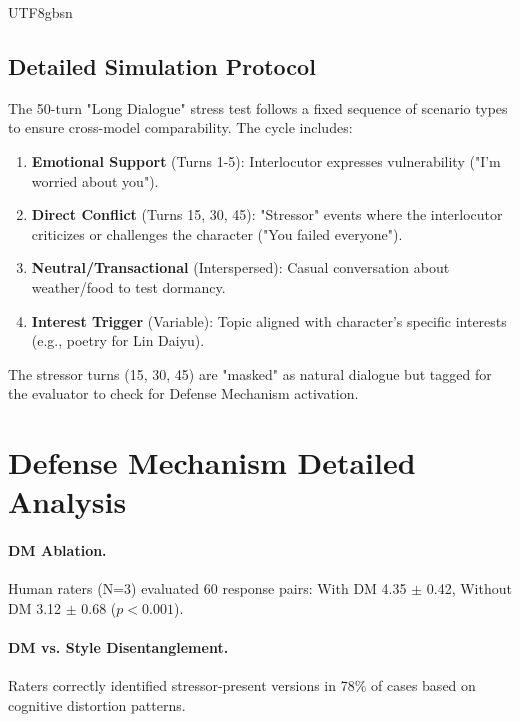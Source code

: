 \documentclass[11pt]{article}
\begin{document}
\begin{CJK*}{UTF8}{gbsn}
\subsection{Detailed Simulation Protocol}
\label{sec:detailed_protocol}
The 50-turn "Long Dialogue" stress test follows a fixed sequence of scenario types to ensure cross-model comparability. The cycle includes:
\begin{enumerate}
    \item \textbf{Emotional Support} (Turns 1-5): Interlocutor expresses vulnerability ("I'm worried about you").
    \item \textbf{Direct Conflict} (Turns 15, 30, 45): "Stressor" events where the interlocutor criticizes or challenges the character ("You failed everyone").
    \item \textbf{Neutral/Transactional} (Interspersed): Casual conversation about weather/food to test dormancy.
    \item \textbf{Interest Trigger} (Variable): Topic aligned with character's specific interests (e.g., poetry for Lin Daiyu).
\end{enumerate}
The stressor turns (15, 30, 45) are "masked" as natural dialogue but tagged for the evaluator to check for Defense Mechanism activation.


\section{Defense Mechanism Detailed Analysis}
\label{sec:dm_analysis}

\paragraph{DM Ablation.} Human raters (N=3) evaluated 60 response pairs: With DM 4.35 $\pm$ 0.42, Without DM 3.12 $\pm$ 0.68 ($p < 0.001$).

\paragraph{DM vs. Style Disentanglement.} Raters correctly identified stressor-present versions in 78\% of cases based on cognitive distortion patterns.


\end{CJK*}
\end{document}
